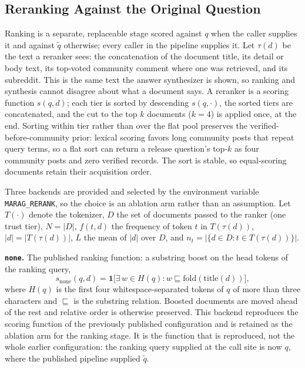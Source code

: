 \documentclass[acmsmall,review,anonymous,screen]{acmart}
\begin{document}
\subsection{Reranking Against the Original Question}\label{sec:rerank}

Ranking is a separate, replaceable stage scored against $q$ when the
caller supplies it and against $\tilde{q}$ otherwise; every caller in
the pipeline supplies it. Let
$\tau(d)$ be the text a reranker sees: the concatenation of the
document title, its detail or body text, its top-voted community
comment where one was retrieved, and its subreddit. This is the same
text the answer synthesizer is shown, so ranking and synthesis cannot
disagree about what a document says. A reranker is a scoring function
$s(q, d)$; each tier is sorted by descending $s(q, \cdot)$, the sorted
tiers are concatenated, and the cut to the top $k$ documents ($k = 4$)
is applied once, at the end. Sorting within tier rather than over the
flat pool preserves the verified-before-community prior: lexical
scoring favors long community posts that repeat query terms, so a flat
sort can return a release question's top-$k$ as four community posts
and zero verified records. The sort is stable, so equal-scoring
documents retain their acquisition order.

Three backends are provided and selected by the environment variable
\texttt{MARAG\_RERANK}, so the choice is an ablation arm rather than an
assumption. Let $T(\cdot)$ denote the tokenizer, $D$ the set of
documents passed to the ranker (one trust tier), $N = |D|$,
$f(t,d)$ the frequency of token $t$ in $T(\tau(d))$,
$|d| = |T(\tau(d))|$, $\overline{L}$ the mean of $|d|$ over $D$, and
$n_t = |\{d \in D : t \in T(\tau(d))\}|$.

\textbf{\texttt{none}.} The published ranking function: a substring
boost on the head tokens of the ranking query,
\begin{equation}
s_{\mathrm{none}}(q, d) = \mathbf{1}\big[\exists\, w \in H(q) : w \sqsubseteq \mathrm{fold}(\mathrm{title}(d))\big],
\label{eq:none}
\end{equation}
where $H(q)$ is the first four whitespace-separated tokens of $q$ of
more than three characters and $\sqsubseteq$ is the substring
relation. Boosted documents are moved ahead of the rest and relative
order is otherwise preserved. This backend reproduces the scoring
function of the previously published configuration and is retained as
the ablation arm for the ranking stage. It is the function that is
reproduced, not the whole earlier configuration: the ranking query
supplied at the call site is now $q$, where the published pipeline
supplied $\tilde{q}$.
\end{document}
